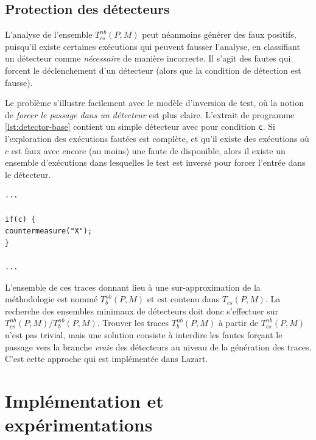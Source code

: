        \subsection{Protection des détecteurs}
        \label{sec:ccpo-prot-det}

            L'analyse de l'ensemble $T^{nb}_{cs}(P, M)$ peut néanmoins générer des faux positifs, puisqu'il existe certaines exécutions qui peuvent fausser l'analyse, en classifiant un détecteur comme \textit{nécessaire} de manière incorrecte. Il s'agit des fautes qui forcent le déclenchement d'un détecteur (alors que la condition de détection est fausse).
             
            Le problème s'illustre facilement avec le modèle d'inversion de test, où la notion de \textit{forcer le passage dans un détecteur} est plus claire.
            L'extrait de programme \ref{lst:detector-base} contient un simple détecteur avec pour condition \texttt{c}. Si l'exploration des exécutions fautées est complète, et qu'il existe des exécutions où $c$ est faux avec encore (au moins) une faute de disponible, alors il existe un ensemble d'exécutions dans lesquelles le test est inversé pour forcer l'entrée dans le détecteur.
                
\begin{minipage}{0.93\linewidth}
\begin{lstlisting}
...

if(c) {
countermeasure("X");
}

...\end{lstlisting} 
\end{minipage}

            L'ensemble de ces traces donnant lieu à une sur-approximation de la méthodologie est nommé $T^{nb}_{b}(P, M)$ et est contenu dans $T_{cs}(P, M)$. La recherche des ensembles minimaux de détecteurs doit donc s'effectuer sur $T^{nb}_{cs}(P, M) / T^{nb}_{b}(P, M)$.
            Trouver les traces $T^{nb}_b(P, M)$ à partir de $T^{nb}_{cs}(P, M)$ n'est pas trivial, mais une solution consiste à interdire les fautes forçant le passage vers la branche \textit{vraie} des détecteurs au niveau de la génération des traces. C'est cette approche qui est implémentée dans Lazart.
                
    \section{Implémentation et expérimentations}
    \label{sec:ccpo-impl}

